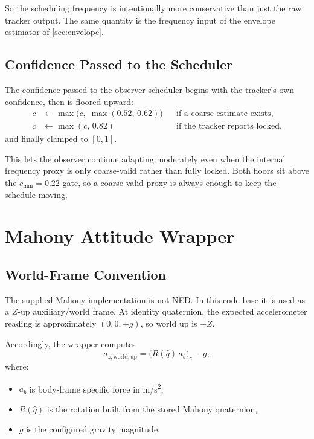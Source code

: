 \documentclass[conference]{IEEEtran}
\begin{document}
    So the scheduling frequency is intentionally more conservative than just the
    raw tracker output. The same quantity is the frequency input of the envelope
    estimator of \cref{sec:envelope}.

    \subsection{Confidence Passed to the Scheduler}

    The confidence passed to the observer scheduler begins with the tracker's own
    confidence, then is floored upward:
    \begin{align}
        c &\leftarrow \max\bigl(c,\;\max(0.52,\,0.62)\bigr)
        && \text{if a coarse estimate exists},\\
        c &\leftarrow \max(c,\,0.82)
        && \text{if the tracker reports locked},
    \end{align}
    and finally clamped to \([0,1]\).

    This lets the observer continue adapting moderately even when the internal
    frequency proxy is only coarse-valid rather than fully locked. Both floors
    sit above the \(c_{\min}=0.22\) gate, so a coarse-valid proxy is always
    enough to keep the schedule moving.

    \section{Mahony Attitude Wrapper}\label{sec:mahony}

    \subsection{World-Frame Convention}

    The supplied Mahony implementation is not NED. In this code base it is used
    as a \(Z\)-up auxiliary/world frame. At identity quaternion, the expected
    accelerometer reading is approximately \((0,0,+g)\), so world up is \(+Z\).

    Accordingly, the wrapper computes
    \begin{equation}
        a_{z,\mathrm{world,up}}
        =
        \bigl(R(\hat{q})\, a_b\bigr)_z - g,
    \end{equation}
    where:
    \begin{itemize}[leftmargin=1.4em]
        \item \(a_b\) is body-frame specific force in \si{m/s^2},
        \item \(R(\hat{q})\) is the rotation built from the stored Mahony
        quaternion,
        \item \(g\) is the configured gravity magnitude.
    \end{itemize}
\end{document}
